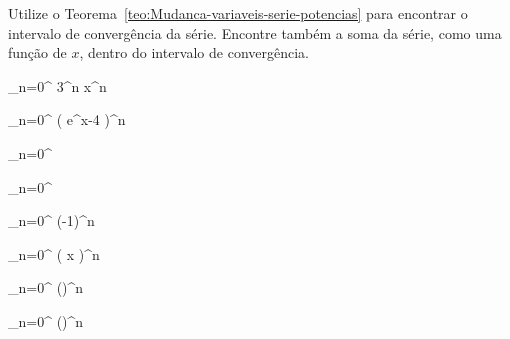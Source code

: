 \begin{exercises}

\begin{exercise}
	Utilize o Teorema~\ref{teo:Mudanca-variaveis-serie-potencias}
	para encontrar o intervalo de convergência da série. Encontre também
	a soma da série, como uma função de $x$, dentro do intervalo de convergência.
	\begin{mathlist}
		\item \sum_{n=0}^{\infty} 3^n x^n
		\item \sum_{n=0}^{\infty} \big( e^x-4 \big)^n
		\item \sum_{n=0}^{\infty} 
		\item \sum_{n=0}^{\infty} 
		\item \sum_{n=0}^{\infty} \left(-1\right)^n
		\item \sum_{n=0}^{\infty} \big( \ln x \big)^n
		\item \sum_{n=0}^{\infty} \left(\right)^n
		\item \sum_{n=0}^{\infty} \left(\right)^n
	\end{mathlist}
\end{exercise}



\end{exercises}
